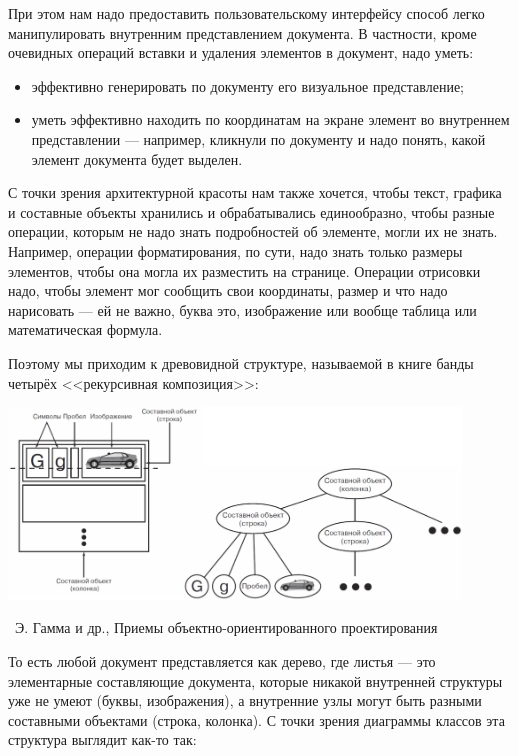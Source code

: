 \documentclass[a5paper]{article}
\newcommand{\attribution}[1] {
    \vspace{-5mm}\begin{flushright}\begin{scriptsize}%
    {\textcopyright\, #1}\end{scriptsize}\end{flushright}
}
\begin{document}
При этом нам надо предоставить пользовательскому интерфейсу способ легко манипулировать внутренним представлением документа. В частности, кроме очевидных операций вставки и удаления элементов в документ, надо уметь:

\begin{itemize}
    \item эффективно генерировать по документу его визуальное представление;
    \item уметь эффективно находить по координатам на экране элемент во внутреннем представлении --- например, кликнули по документу и надо понять, какой элемент документа будет выделен.
\end{itemize}

С точки зрения архитектурной красоты нам также хочется, чтобы текст, графика и составные объекты хранились и обрабатывались единообразно, чтобы разные операции, которым не надо знать подробностей об элементе, могли их не знать. Например, операции форматирования, по сути, надо знать только размеры элементов, чтобы она могла их разместить на странице. Операции отрисовки надо, чтобы элемент мог сообщить свои координаты, размер и что надо нарисовать --- ей не важно, буква это, изображение или вообще таблица или математическая формула.

Поэтому мы приходим к древовидной структуре, называемой в книге банды четырёх <<рекурсивная композиция>>:

\begin{center}
    \includegraphics[width=0.9\textwidth]{recursiveComposition.png}
    \attribution{Э. Гамма и др., Приемы объектно-ориентированного проектирования}
\end{center}

То есть любой документ представляется как дерево, где листья --- это элементарные составляющие документа, которые никакой внутренней структуры уже не умеют (буквы, изображения), а внутренние узлы могут быть разными составными объектами (строка, колонка). С точки зрения диаграммы классов эта структура выглядит как-то так:
\end{document}
